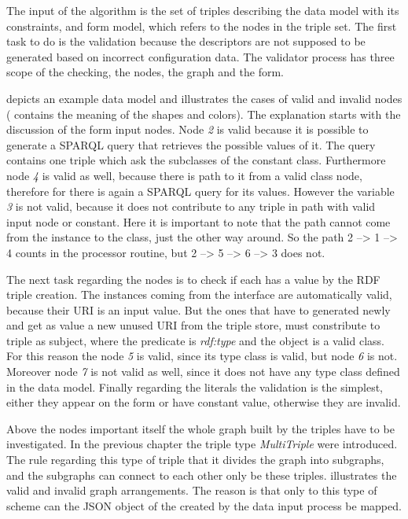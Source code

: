 The input of the algorithm is the set of triples describing the data model with its constraints, and form model, which refers to the nodes in the triple set. The first task to do is the validation because the descriptors are not supposed to be generated based on incorrect configuration data. The validator process has three scope of the checking, the nodes, the graph and the form.
 
 depicts an example data model and illustrates the cases of valid and invalid nodes ( contains the meaning of the shapes and colors). The explanation starts with the discussion of the form input nodes. Node \textit{2} is valid because it is possible to generate a SPARQL query that retrieves the possible values of it. The query contains one triple which ask the subclasses of the constant class. Furthermore node \textit{4} is valid as well, because there is path to it from a valid class node, therefore for there is again a SPARQL query for its values. However the variable \textit{3} is not valid, because it does not contribute to any triple in path with valid input node or constant. Here it is important to note that the path cannot come from the instance to the class, just the other way around. So the path 2 --> 1 --> 4 counts in the processor routine, but 2 --> 5 --> 6 --> 3 does not.
  


The next task regarding the nodes is to check if each has a value by the RDF triple creation. The instances coming from the interface are automatically valid, because their URI is an input value. But the ones that have to generated newly and get as value a new unused URI from the triple store, must constribute to triple as subject, where the predicate is \textit{rdf:type} and the object is a valid class. For this reason the node \textit{5} is valid, since its type class is valid, but node \textit{6} is not. Moreover node \textit{7} is not valid as well, since it does not have any type class defined in the data model. Finally regarding the literals the validation is the simplest, either they appear on the form or have constant value, otherwise they are invalid. 




Above the nodes important itself the whole graph built by the triples have to be investigated. In the previous chapter the triple type \textit{MultiTriple} were introduced. The rule regarding this type of triple that it divides the graph into subgraphs, and the subgraphs can connect to each other only be these triples.  illustrates the valid and invalid graph arrangements. The reason is that only to this type of scheme can the JSON object of the created by the data input process be mapped.


